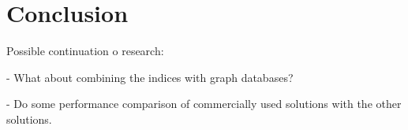 \chapter*{Conclusion}

Possible continuation o research:

 - What about combining the indices with graph databases? 

 - Do some performance comparison of commercially used solutions with the other solutions.

 
